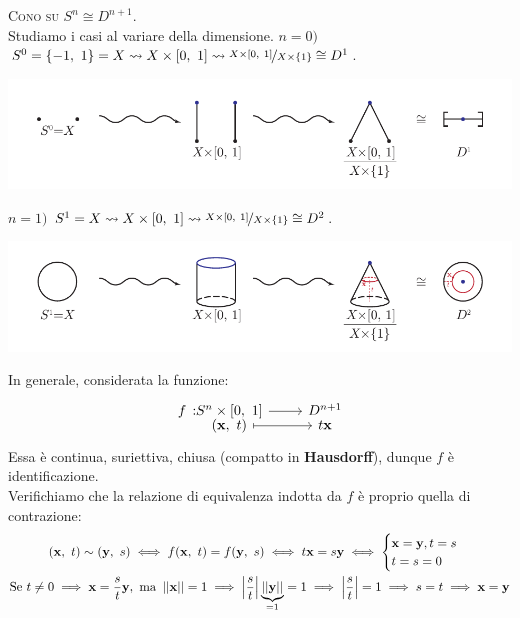 \begin{example} \textsc{Cono su} $S^n \cong D^{n+1}$.\\
	Studiamo i casi al variare della dimensione.
	$n=0)$ $S^0=\{-1, \ 1\}=X \rightsquigarrow X\times\left[0,\ 1\right] \rightsquigarrow \nicefrac{X\times\left[0,\ 1\right]}{X\times \{1\}} \cong D^1$.
\begin{center}
	\includegraphics[trim=0cm 0cm 0cm 0cm,clip,scale=0.9]{images/cones0.pdf}
\end{center}
	$n=1)$ $S^1=X \rightsquigarrow X\times\left[0,\ 1\right] \rightsquigarrow \nicefrac{X\times\left[0,\ 1\right]}{X\times \{1\}} \cong D^2$.
\begin{center}
	\includegraphics[trim=0cm 0cm 0cm 0cm,clip,scale=0.9]{images/cones1.pdf}
\end{center}
	In generale, considerata la funzione:
	\begin{equation*}
		\funztot f {S^n\times\intv} {D^{n+1}} {(\mathbf{x}, \ t)} {t\mathbf{x}}
	\end{equation*}
	Essa è continua, suriettiva, chiusa (compatto in \textbf{Hausdorff}), dunque $f$ è identificazione.\\
	Verifichiamo che la relazione di equivalenza indotta da $f$ è proprio quella di contrazione:
		\begin{gather*}
			(\mathbf{x}, \ t)\sim (\mathbf{y}, \ s) \iff f(\mathbf{x}, \ t)=f(\mathbf{y}, \ s) \iff t\mathbf{x}=s\mathbf{y} \iff \begin{cases}
				\mathbf{x=y}, t=s \\
				t=s=0
			\end{cases}\\
			\text{Se } t\neq 0 \implies \mathbf{x}=\frac{s}{t}\mathbf{y}, \text{ ma } \labs\mathbf{x}\rabs=1 \implies \left| \frac{s}{t} \right| \underbrace{\labs\mathbf{y}\rabs}_{=1}=1 \implies \left| \frac{s}{t} \right| =1 \implies s=t \implies \mathbf{x=y}
		\end{gather*}
	\vspace{-6mm}
\end{example}
